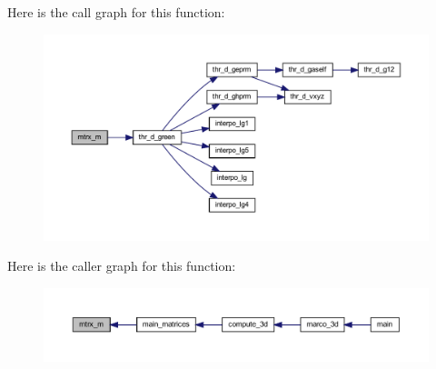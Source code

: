Here is the call graph for this function\+:
\nopagebreak
\begin{figure}[H]
\begin{center}
\leavevmode
\includegraphics[width=350pt]{Marco_8f90_a1a5af411215f6aafd8701c9d0a5841ab_cgraph}
\end{center}
\end{figure}
Here is the caller graph for this function\+:
\nopagebreak
\begin{figure}[H]
\begin{center}
\leavevmode
\includegraphics[width=350pt]{Marco_8f90_a1a5af411215f6aafd8701c9d0a5841ab_icgraph}
\end{center}
\end{figure}
\mbox{\label{Marco_8f90_acd41ae7686429d1720e6242646b50bc1}} 
